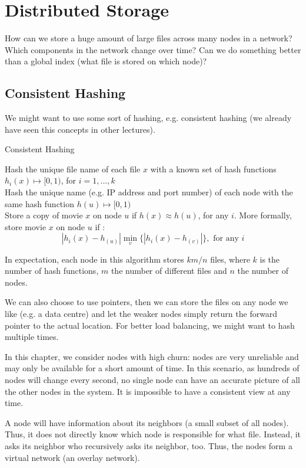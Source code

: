 \section{Distributed Storage}

How can we store a huge amount of large files across many nodes in a network? Which components in the network change over time? Can we do something better than a global index (what file is stored on which node)?


\subsection{Consistent Hashing}

We might want to use some sort of hashing, e.g. consistent hashing (we already have seen this concepts in other lectures).\medskip

\begin{algorithm}[H]
\caption{Consistent Hashing}
	Hash the unique file name of each file $x$ with a known set of hash functions $h_i(x) \mapsto [0, 1)$, for $i = 1,...,k$ \\
	Hash the unique name (e.g. IP address and port number) of each node with the same hash function $h(u) \mapsto [0, 1)$ \\
	Store a copy of movie $x$ on node $u$ if $h(x) \approx h(u)$, for any $i$. More formally, store movie $x$ on node $u$ if :
$$|h_i(x) -  h_(u)| \min_v \{|h_i(x) -  h_(v)|\}, \text{ for any } i$$	
\end{algorithm}
\medskip

In expectation, each node in this algorithm stores $km/n$ files, where $k$ is the number of hash functions, $m$ the number of different files and $n$ the number of nodes. \medskip

We can also choose to use pointers, then we can store the files on any node we like (e.g. a data centre) and let the weaker nodes simply return the forward pointer to the actual location. For better load balancing, we might want to hash multiple times. \medskip

In this chapter, we consider nodes with high churn: nodes are very unreliable and may only be available for a short amount of time. In this scenario, as hundreds of nodes will change every second, no single node can have an accurate picture of all the other nodes in the system. It is impossible to have a consistent view at any time. \medskip

A node will have information about its neighbors (a small subset of all nodes). Thus, it does not directly know which node is responsible for what file. Instead, it asks its neighbor who recursively asks its neighbor, too. Thus, the nodes form a virtual network (an overlay network).


